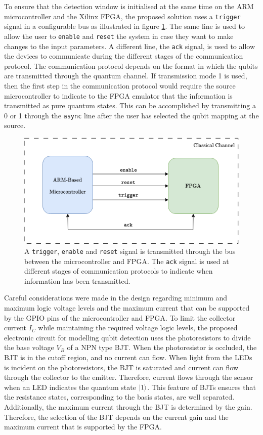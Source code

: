 To ensure that the detection window is initialised at the same time on the ARM microcontroller and the Xilinx FPGA, the proposed solution uses a \texttt{trigger} signal in a configurable bus as illustrated in figure \ref{fig:trigger}. The same line is used to allow the user to \texttt{enable} and \texttt{reset} the system in case they want to make changes to the input parameters. A different line, the \texttt{ack} signal, is used to allow the devices to communicate during the different stages of the communication protocol. The communication protocol depends on the format in which the qubits are transmitted through the quantum channel. If transmission mode 1 is used, then the first step in the communication protocol would require the source microcontroller to indicate to the FPGA emulator that the information is transmitted as pure quantum states. This can be accomplished by transmitting a 0 or 1 through the \texttt{async} line after the user has selected the qubit mapping at the source. 

\begin{figure}[!ht]
	\centering
	\includegraphics[width=1.0\linewidth]{body/ch4/figs/trigger}
	\caption[Illustrating the Classical Channel Between the ARM-Based Microcontroller and the FPGA.]{A \texttt{trigger}, \texttt{enable} and \texttt{reset} signal is transmitted through the bus between the microcontroller and FPGA. The \texttt{ack} signal is used at different stages of communication protocols to indicate when information has been transmitted.}
	\label{fig:trigger}
\end{figure}

Careful considerations were made in the design regarding minimum and maximum logic voltage levels and the maximum current that can be supported by the GPIO pins of the microcontroller and FPGA. To limit the collector current $I_C$ while maintaining the required voltage logic levels, the proposed electronic circuit for modelling qubit detection uses the photoresistors to divide the base voltage $V_B$ of a NPN type BJT. When the photoresistor is occluded, the BJT is in the cutoff region, and no current can flow. When light from the LEDs is incident on the photoresistors, the BJT is saturated and current can flow through the collector to the emitter. Therefore, current flows through the sensor when an LED indicates the quantum state $\ket{1}$. This feature of BJTs ensures that the resistance states, corresponding to the basis states, are well separated. Additionally, the maximum current through the BJT is determined by the gain. Therefore, the selection of the BJT depends on the current gain and the maximum current that is supported by the FPGA. 

